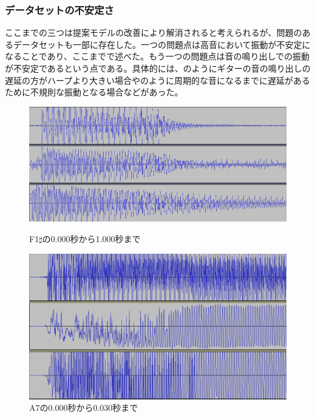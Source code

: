 \subsubsection{データセットの不安定さ}

ここまでの三つは提案モデルの改善により解消されると考えられるが、問題のあるデータセットも一部に存在した。一つの問題点は高音において振動が不安定になることであり、ここまでで述べた。もう一つの問題点は音の鳴り出しでの振動が不安定であるという点である。具体的には、のようにギターの音の鳴り出しの遅延の方がハープより大きい場合やのように周期的な音になるまでに遅延があるために不規則な振動となる場合などがあった。

\begin{figure}[b]
\centering
\begin{minipage}{0.48\columnwidth}
\centering
\includegraphics[width=0.9\columnwidth]{figure/88_88/f1s.png}
\caption[F1$\sharp$の音波]{F1$\sharp$の0.000秒から1.000秒まで}
\label{fig:88_88_lag1}
\end{minipage}
\begin{minipage}{0.48\columnwidth}
\centering
\includegraphics[width=0.75\columnwidth]{figure/88_88_det/a7_0_0030.png}
\caption[A7の音波]{A7の0.000秒から0.030秒まで}
\label{fig:88_88_lag2}
\end{minipage}
\end{figure}